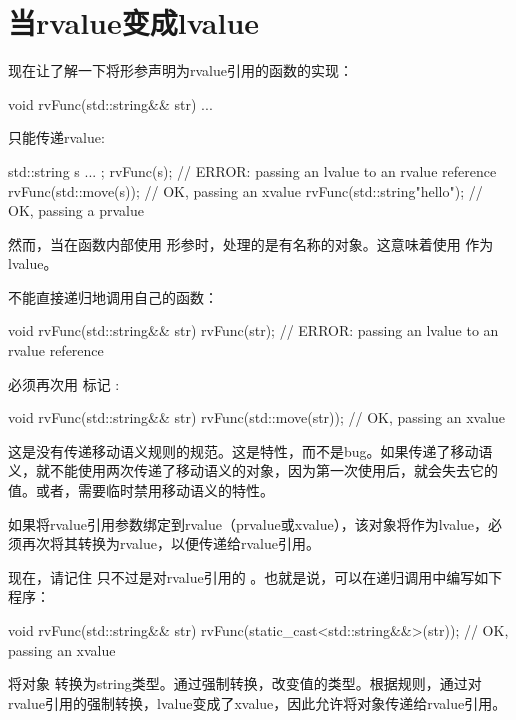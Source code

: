\section{当rvalue变成lvalue}
现在让了解一下将形参声明为rvalue引用的函数的实现：

\begin{cppcode}
void rvFunc(std::string&& str) {
	...
}
\end{cppcode}

只能传递rvalue:

\begin{cppcode}
std::string s{ ... };
rvFunc(s); // ERROR: passing an lvalue to an rvalue reference
rvFunc(std::move(s)); // OK, passing an xvalue
rvFunc(std::string{"hello"}); // OK, passing a prvalue
\end{cppcode}

然而，当在函数内部使用  形参时，处理的是有名称的对象。这意味着使用  作为lvalue。

不能直接递归地调用自己的函数：

\begin{cppcode}
void rvFunc(std::string&& str) {
	rvFunc(str); // ERROR: passing an lvalue to an rvalue reference
}
\end{cppcode}

必须再次用  标记 :

\begin{cppcode}
void rvFunc(std::string&& str) {
	rvFunc(std::move(str)); // OK, passing an xvalue
}
\end{cppcode}

这是没有传递移动语义规则的规范。这是特性，而不是bug。如果传递了移动语义，就不能使用两次传递了移动语义的对象，因为第一次使用后，就会失去它的值。或者，需要临时禁用移动语义的特性。

如果将rvalue引用参数绑定到rvalue（prvalue或xvalue），该对象将作为lvalue，必须再次将其转换为rvalue，以便传递给rvalue引用。

现在，请记住  只不过是对rvalue引用的 。也就是说，可以在递归调用中编写如下程序：

\begin{cppcode}
void rvFunc(std::string&& str) {
	rvFunc(static_cast<std::string&&>(str)); // OK, passing an xvalue
}
\end{cppcode}

将对象  转换为string类型。通过强制转换，改变值的类型。根据规则，通过对rvalue引用的强制转换，lvalue变成了xvalue，因此允许将对象传递给rvalue引用。

